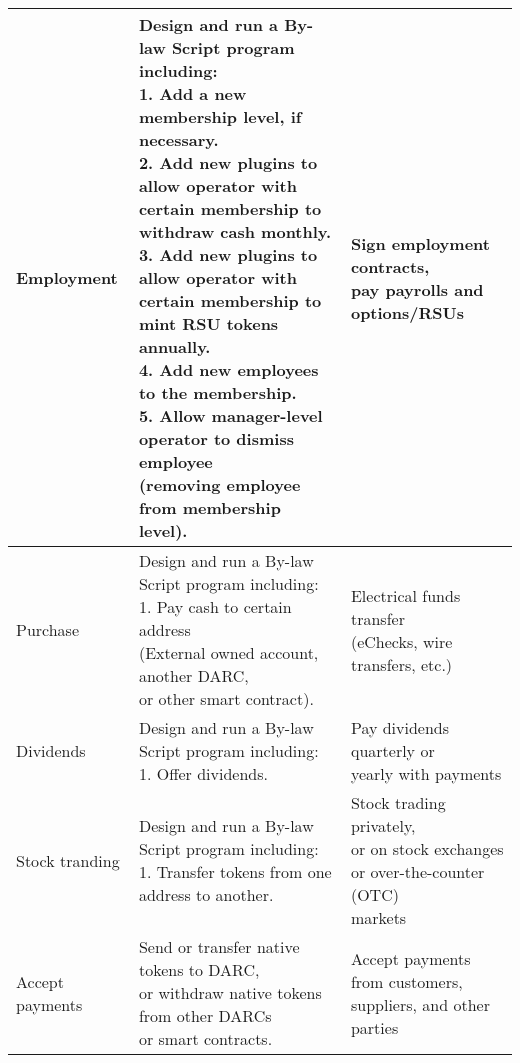 \documentclass[main.tex]{subfiles}
\begin{document}
\begin{table}[h!]
\begin{tabular}{| l | l| l|}
    \hline
    Employment & \makecell[l]{Design and run a By-law Script program including: \\ 1. Add a new membership level, if necessary.\\ 2. Add new plugins to allow operator with \\ certain membership to withdraw cash monthly. \\ 3. Add new plugins to allow operator with \\ certain membership to mint RSU tokens annually. \\ 4. Add new employees to the membership. \\ 5. Allow manager-level operator to dismiss employee\\(removing employee from membership level).   } & \makecell[l]{Sign employment contracts, \\ pay payrolls and options/RSUs} \\
    \hline
    Purchase & \makecell[l]{Design and run a By-law Script program including: \\ 1. Pay cash to certain address \\ (External owned account, another DARC, \\ or other smart contract). }  & \makecell[l]{Electrical funds transfer \\ (eChecks, wire transfers, etc.)} \\
    \hline
    Dividends & \makecell[l]{Design and run a By-law Script program including: \\ 1. Offer dividends. } & \makecell[l]{Pay dividends quarterly or \\ yearly with payments} \\
    \hline 
    Stock tranding & \makecell[l]{Design and run a By-law Script program including: \\ 1. Transfer tokens from one address to another. } & \makecell[l]{Stock trading privately, \\ or on stock exchanges \\ or over-the-counter (OTC) \\ markets} \\
    \hline
    Accept payments & \makecell[l]{Send or transfer native tokens to DARC, \\ or withdraw native tokens from other DARCs \\ or smart contracts.} & \makecell[l]{Accept payments from customers, \\ suppliers, and other parties} \\
    \hline 

\end{tabular}
\end{table}
\end{document}
